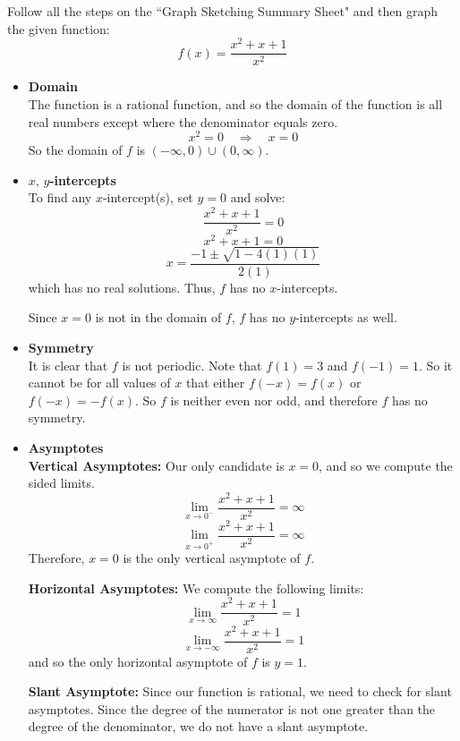 \documentclass[nooutcomes]{ximera}
\newcommand{\dfn}{\textbf}
\renewenvironment{freeResponse}{
\ifhandout\setbox0\vbox\bgroup\else
\begin{trivlist}\item[\hskip \labelsep\bfseries Solution:\hspace{2ex}]
\fi}
{\ifhandout\egroup\else
\end{trivlist}
\fi}
\begin{document}
\begin{problem}
Follow all the steps on the ``Graph Sketching Summary Sheet" and then graph the given function:
$$ f(x) = \frac{x^2 + x + 1}{x^2} $$

		\begin{freeResponse}  

		\begin{itemize}
		
			\item  \dfn{Domain}  \\
			The function is a rational function, and so the domain of the function is all real numbers except where the denominator equals zero.
			$$ x^2 = 0 \quad \Longrightarrow \quad x=0 $$
			So the domain of $f$ is $(-\infty ,0)\cup (0,\infty )$.
			
			
			
			\item  \dfn{$x,\, y$-intercepts}  \\
			To find any $x$-intercept(s), set $y=0$ and solve:
			$$ \frac{x^2 + x + 1}{x^2} = 0 $$
			$$ x^2 + x + 1 = 0 $$
			$$ x = \frac{-1 \pm \sqrt{1-4(1)(1)}}{2(1)} $$
			which has no real solutions.  Thus, $f$ has no $x$-intercepts.
			
			Since $x=0$ is not in the domain of $f$, $f$ has no $y$-intercepts as well.
			
			
			
			\item  \dfn{Symmetry}  \\
			
			It is clear that $f$ is not periodic.  Note that $f(1) = 3$ and $f(-1) = 1$.  So it cannot be for all values of $x$ that either $f(-x) = f(x)$ or $f(-x) = -f(x)$.  So $f$ is neither even nor odd, and therefore $f$ has no symmetry.
			
			\item  \dfn{Asymptotes}  \\
			\dfn{Vertical Asymptotes:}  Our only candidate is $x=0$, and so we compute the sided limits.
			$$ \lim_{x \to 0^-} \frac{x^2+x+1}{x^2} = \infty $$
			$$ \lim_{x \to 0^+} \frac{x^2+x+1}{x^2} = \infty $$
			Therefore, $x=0$ is the only vertical asymptote of $f$.
			
			\dfn{Horizontal Asymptotes:}  We compute the following limits:
			$$ \lim_{x \to \infty} \frac{x^2+x+1}{x^2} = 1 $$
			$$ \lim_{x \to -\infty} \frac{x^2+x+1}{x^2} = 1 $$
			and so the only horizontal asymptote of $f$ is $y=1$.
			
			\dfn{Slant Asymptote:}  Since our function is rational, we need to check for slant asymptotes.  Since the degree of the numerator is not one greater than the degree of the denominator, we do not have a slant asymptote.
			

\end{itemize}
\end{freeResponse}
\end{problem}
\end{document}
